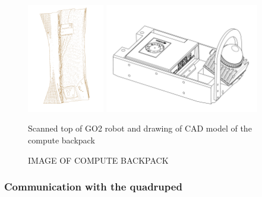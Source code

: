 \documentclass[11pt]{article}
\begin{document}
        \begin{figure}[H]
            \centering
            \includegraphics[width=0.3\textwidth]{Images/ScanGO2Top.pdf}
            \includegraphics[width=0.6\textwidth]{Images/ComputeBackpack.pdf}
            \caption{Scanned top of GO2 robot and drawing of CAD model of the compute backpack }
            \label{fig:scanner_and_cad}
        \end{figure}




        \begin{figure}[H]
            \centering
            \color{red}
            IMAGE OF COMPUTE BACKPACK
        \end{figure}


        
        \subsubsection{Communication with the quadruped}

        
\end{document}
